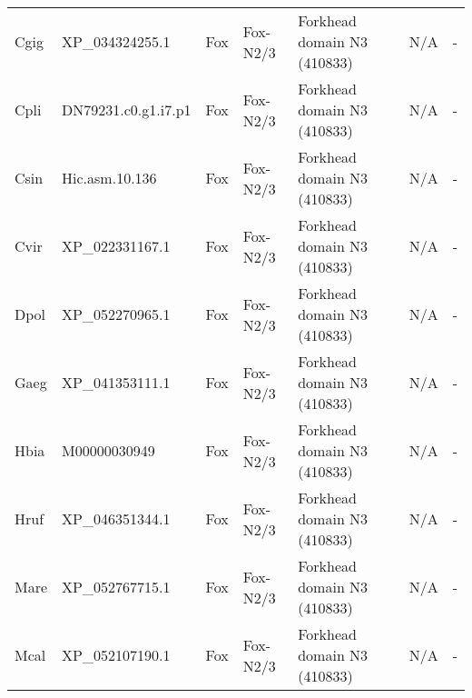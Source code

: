\documentclass[../main.tex]{subfiles}
\begin{document}
\begin{landscape}
\begin{longtable}{lllllll}
		Cgig           & XP\_034324255.1       & Fox            & Fox-N2/3            & Forkhead domain N3 (410833)                 & N/A                                                                    & -                    \\
		Cpli           & DN79231.c0.g1.i7.p1   & Fox            & Fox-N2/3            & Forkhead domain N3 (410833)                 & N/A                                                                    & -                    \\
		Csin           & Hic.asm.10.136        & Fox            & Fox-N2/3            & Forkhead domain N3 (410833)                 & N/A                                                                    & -                    \\
		Cvir           & XP\_022331167.1       & Fox            & Fox-N2/3            & Forkhead domain N3 (410833)                 & N/A                                                                    & -                    \\
		Dpol           & XP\_052270965.1       & Fox            & Fox-N2/3            & Forkhead domain N3 (410833)                 & N/A                                                                    & -                    \\
		Gaeg           & XP\_041353111.1       & Fox            & Fox-N2/3            & Forkhead domain N3 (410833)                 & N/A                                                                    & -                    \\
		Hbia           & M00000030949          & Fox            & Fox-N2/3            & Forkhead domain N3 (410833)                 & N/A                                                                    & -                    \\
		Hruf           & XP\_046351344.1       & Fox            & Fox-N2/3            & Forkhead domain N3 (410833)                 & N/A                                                                    & -                    \\
		Mare           & XP\_052767715.1       & Fox            & Fox-N2/3            & Forkhead domain N3 (410833)                 & N/A                                                                    & -                    \\
		Mcal           & XP\_052107190.1       & Fox            & Fox-N2/3            & Forkhead domain N3 (410833)                 & N/A                                                                    & -                    \\

\end{longtable}
\end{landscape}
\end{document}
